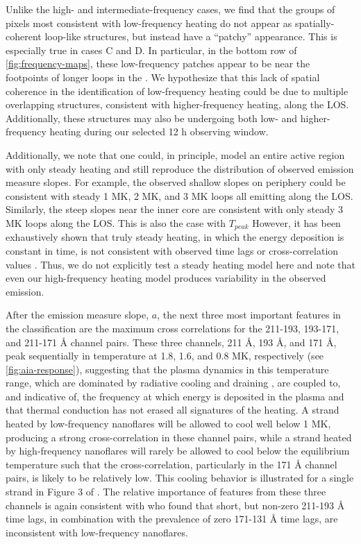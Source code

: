 Unlike the high- and intermediate-frequency cases, we find that the groups of pixels most consistent with low-frequency heating do not appear as spatially-coherent loop-like structures, but instead have a ``patchy'' appearance.
This is especially true in cases C and D.
In particular, in the bottom row of \autoref{fig:frequency-maps}, these low-frequency patches appear to be near the footpoints of longer loops in the \AR{}.
We hypothesize that this lack of spatial coherence in the identification of low-frequency heating could be due to multiple overlapping structures, consistent with higher-frequency heating, along the LOS.
Additionally, these structures may also be undergoing both low- and higher-frequency heating during our selected 12 h observing window.

Additionally, we note that one could, in principle, model an entire active region with only steady heating and still reproduce the distribution of observed emission measure slopes.
For example, the observed shallow slopes on periphery could be consistent with steady 1 MK, 2 MK, and 3 MK loops all emitting along the LOS.
Similarly, the steep slopes near the inner core are consistent with only steady 3 MK loops along the LOS.
This is also the case with $T_{peak}$
However, it has been exhaustively shown that truly steady heating, in which the energy deposition is constant in time, is not consistent with observed time lags or cross-correlation values \citep[e.g.][]{viall_signatures_2016}.
Thus, we do not explicitly test a steady heating model here and note that even our high-frequency heating model produces variability in the observed emission.

After the emission measure slope, $a$, the next three most important features in the classification are the maximum cross correlations for the 211-193, 193-171, and 211-171 \AA{} channel pairs.
These three channels, 211 \AA{}, 193 \AA{}, and 171 \AA{}, peak sequentially in temperature at 1.8, 1.6, and 0.8 MK, respectively (see \autoref{fig:aia-response}), suggesting that the plasma dynamics in this temperature range, which are dominated by radiative cooling and draining \citep[e.g.][]{bradshaw_cooling_2005,bradshaw_cooling_2010,bradshaw_new_2010}, are coupled to, and indicative of, the frequency at which energy is deposited in the plasma and that thermal conduction has not erased all signatures of the heating.
A strand heated by low-frequency nanoflares will be allowed to cool well below 1 MK, producing a strong cross-correlation in these channel pairs, while a strand heated by high-frequency nanoflares will rarely be allowed to cool below the equilibrium temperature such that the cross-correlation, particularly in the 171 \AA{} channel pairs, is likely to be relatively low.
This cooling behavior is illustrated for a single strand in Figure 3 of .
The relative importance of features from these three channels is again consistent with \citet{bradshaw_patterns_2016} who found that short, but non-zero 211-193 \AA{} time lags, in combination with the prevalence of zero 171-131 \AA{} time lags, are inconsistent with low-frequency nanoflares.

